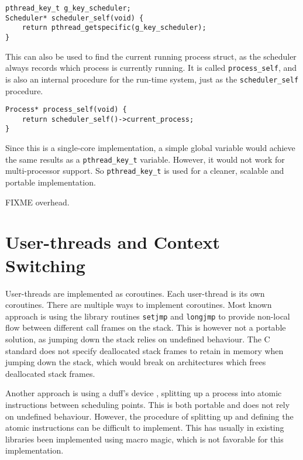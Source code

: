 \begin{lstlisting}[style={CustomC},caption={Procedure to find the scheduler for a given kernel\hyp{}trhead}]
pthread_key_t g_key_scheduler;
Scheduler* scheduler_self(void) {
    return pthread_getspecific(g_key_scheduler);
}
\end{lstlisting}

This can also be used to find the current running process struct, as the scheduler always records which process is currently running. It is called \texttt{process\_self}, and is also an internal procedure for the run\hyp{}time system, just as the \texttt{scheduler\_self} procedure.

\begin{lstlisting}[style={CustomC},caption={Procedure to find the current running process}]
Process* process_self(void) {
    return scheduler_self()->current_process;
}
\end{lstlisting}

Since this is a single\hyp{}core implementation, a simple global variable would achieve the same results as a \texttt{pthread\_key\_t} variable. However, it would not work for multi\hyp{}processor support. So \texttt{pthread\_key\_t} is used for a cleaner, scalable and portable implementation.

FIXME overhead.

\section{User\hyp{}threads and Context Switching}

User\hyp{}threads are implemented as coroutines. Each user\hyp{}thread is its own coroutines. There are multiple ways to implement coroutines. Most known approach is using the library routines \texttt{setjmp} and \texttt{longjmp} to provide non\hyp{}local flow between different call frames on the stack. This is however not a portable solution, as jumping down the stack relies on undefined behaviour. The C standard does not specify deallocated stack frames to retain in memory when jumping down the stack, which would break on architectures which frees deallocated stack frames.

Another approach is using a duff's device \citep{duffsdevice}, splitting up a process into atomic instructions between scheduling points. This is both portable and does not rely on undefined behaviour. However, the procedure of splitting up and defining the atomic instructions can be difficult to implement. This has usually in existing libraries been implemented using macro magic, which is not favorable for this implementation.

